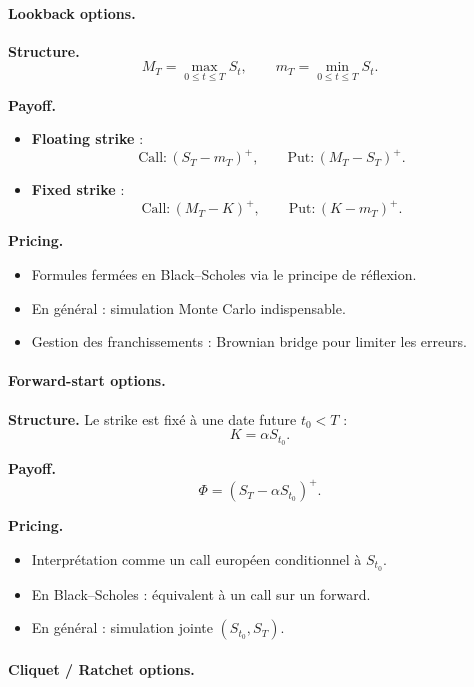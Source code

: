 \documentclass[11pt,a4paper]{article}
\newcommand{\1}{\mathbf{1}}
\begin{document}
\paragraph{Lookback options.}

\textbf{Structure.}
\[
M_T = \max_{0 \le t \le T} S_t,
\qquad
m_T = \min_{0 \le t \le T} S_t.
\]

\textbf{Payoff.}
\begin{itemize}
  \item \textbf{Floating strike} :
  \[
  \text{Call}: (S_T - m_T)^+,
  \qquad
  \text{Put}: (M_T - S_T)^+.
  \]
  \item \textbf{Fixed strike} :
  \[
  \text{Call}: (M_T - K)^+,
  \qquad
  \text{Put}: (K - m_T)^+.
  \]
\end{itemize}

\textbf{Pricing.}
\begin{itemize}
  \item Formules fermées en Black--Scholes via le principe de réflexion.
  \item En général : simulation Monte Carlo indispensable.
  \item Gestion des franchissements : Brownian bridge pour limiter les erreurs.
\end{itemize}

\paragraph{Forward-start options.}

\textbf{Structure.}
Le strike est fixé à une date future $t_0 < T$ :
\[
K = \alpha S_{t_0}.
\]

\textbf{Payoff.}
\[
\Phi = (S_T - \alpha S_{t_0})^+.
\]

\textbf{Pricing.}
\begin{itemize}
  \item Interprétation comme un call européen conditionnel à $S_{t_0}$.
  \item En Black--Scholes : équivalent à un call sur un forward.
  \item En général : simulation jointe $(S_{t_0}, S_T)$.
\end{itemize}

\paragraph{Cliquet / Ratchet options.}
\end{document}
